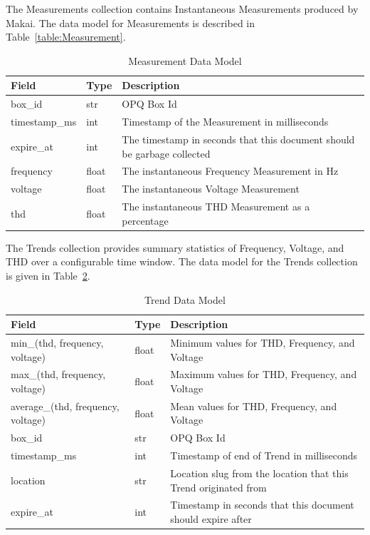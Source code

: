 The Measurements collection contains Instantaneous Measurements produced by Makai. The data model for Measurements is described in Table~\ref{table:Measurement}.

\begin{table}[H]
	\centering
	\caption{Measurement Data Model}
	\begin{tabularx}{\textwidth}{llX}
		\toprule
		\textbf{Field} & \textbf{Type} & \textbf{Description} \\
		\midrule
		box\_id & str & OPQ Box Id \\
		timestamp\_ms & int & Timestamp of the Measurement in milliseconds \\
		expire\_at & int & The timestamp in seconds that this document should be garbage collected \\
		frequency & float & The instantaneous Frequency Measurement in Hz \\
		voltage & float & The instantaneous Voltage Measurement \\
		thd & float & The instantaneous THD Measurement as a percentage \\
		\bottomrule
	\end{tabularx}
	\label{table:Measurements}
\end{table}

The Trends collection provides summary statistics of Frequency, Voltage, and THD over a configurable time window. The data model for the Trends collection is given in Table~\ref{table:Trends}.

\begin{table}[H]
	\centering
	\caption{Trend Data Model}
	\begin{tabularx}{\textwidth}{XlX}
		\toprule
		\textbf{Field} & \textbf{Type} & \textbf{Description} \\
		\midrule
		min\_(thd, frequency, voltage) & float & Minimum values for THD, Frequency, and Voltage \\
		max\_(thd, frequency, voltage) & float & Maximum values for THD, Frequency, and Voltage \\
		average\_(thd, frequency, voltage) & float & Mean values for THD, Frequency, and Voltage \\
		box\_id & str & OPQ Box Id \\
		timestamp\_ms & int & Timestamp of end of Trend in milliseconds \\
		location & str & Location slug from the location that this Trend originated from \\
		expire\_at & int & Timestamp in seconds that this document should expire after \\
		\bottomrule
	\end{tabularx}
	\label{table:Trends}
\end{table}

